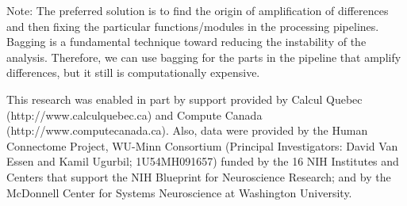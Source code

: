 \documentclass[a4paper,num-refs]{oup-contemporary}
\newcommand{\note}[2]{\color{blue}Note: #1\color{black}}
\begin{document}
\note{The preferred solution is to find the origin of amplification of differences and 
then fixing the particular functions/modules in the processing pipelines. 
Bagging is a fundamental technique toward reducing the instability of the analysis.
Therefore, we can use bagging for the parts in the pipeline that amplify differences, 
but it still is computationally expensive. }




\section{Acknowledgments}

This research was enabled in part by support provided by 
Calcul Quebec (http://www.calculquebec.ca) and 
Compute Canada (http://www.computecanada.ca).
Also, data were provided by the Human Connectome Project, WU-Minn 
Consortium (Principal Investigators: David Van Essen and Kamil Ugurbil; 
1U54MH091657) funded by the 16 NIH Institutes and Centers that support 
the NIH Blueprint for Neuroscience Research; and by the McDonnell 
Center for Systems Neuroscience at Washington University.








\end{document}
